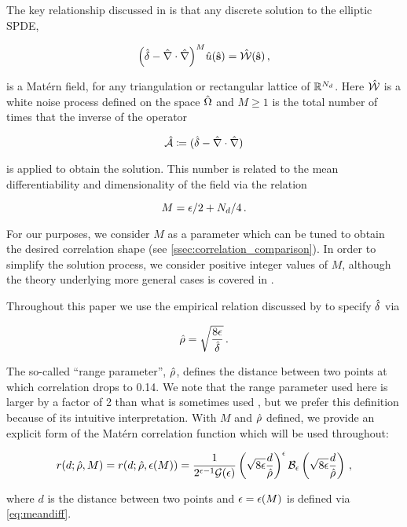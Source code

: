 The key relationship discussed in \citet{RSSB:RSSB777} is that any discrete solution to
the elliptic SPDE,
\begin{linenomath*}\begin{equation}
    \Big(\hat{\delta} - \hat{\nabla}\cdot\hat{\nabla}\Big)^{M}\hat{u}(\hat{\mathbf{s}}) =
    \hat{\mathcal{W}}(\hat{\mathbf{s}}) \, ,
    \label{eq:spde_iso}
\end{equation}\end{linenomath*}
is a Mat\'ern field, for any triangulation or rectangular lattice of $\mathbb{R}^{N_{d}}$.
Here
$\hat{\mathcal{W}}$ is a white noise process defined on the space $\hat{\Omega}$ and
$M\ge 1$ is the total number of times that the inverse of the operator
\begin{linenomath*}\begin{equation*}
\hat{\mathcal{A}} \coloneqq (\hat{\delta} - \hat{\nabla} \cdot \hat{\nabla})
\end{equation*}\end{linenomath*}
is applied to obtain the solution.
This number is related to the mean differentiability and
dimensionality of the field via the relation
\begin{linenomath*}\begin{equation}
    M = \epsilon/2 + N_{d}/4 \, .
    \label{eq:meandiff}
\end{equation}\end{linenomath*}
For our purposes, we consider $M$ as a parameter which can be tuned to obtain the
desired correlation shape (see \cref{ssec:correlation_comparison}).
In order to simplify the solution process, we consider positive integer values
of $M$, although the theory underlying more general cases is covered
in \citet{RSSB:RSSB777}.

Throughout this paper we use the empirical relation discussed by
\citet{RSSB:RSSB777} to specify $\hat{\delta}$ via
\begin{linenomath*}\begin{equation}
    \hat{\rho} = \sqrt{\dfrac{8\epsilon}{\hat{\delta}}} \, .
\end{equation}\end{linenomath*}
The so-called ``range parameter'', $\hat{\rho}$, defines the distance between two
points at which correlation drops to 0.14.
We note that the range parameter used here is larger by a factor of 2 than what
is sometimes used \citep[e.g.,][]{rasmussen_gaussian_2006},
but we prefer this definition because of its intuitive interpretation.
With $M$ and $\hat{\rho}$ defined, we provide an explicit form of the Mat\'ern
correlation function which will be used throughout:
\begin{linenomath*}\begin{equation}
    r(d; \hat{\rho}, M) =
    r(d; \hat{\rho}, \epsilon(M)) =
    \dfrac{1}{2^{\epsilon-1}
    \mathcal{G}(\epsilon)}
    \left(\sqrt{8\epsilon} \dfrac{d}{\hat{\rho}}\right)^{\epsilon}
    \mathcal{B}_{\epsilon}
    \left(\sqrt{8\epsilon} \dfrac{d}{\hat{\rho}}\right) \, ,
\end{equation}\end{linenomath*}
where $d$ is the distance between two points and $\epsilon = \epsilon(M)$ is defined via
\cref{eq:meandiff}.

